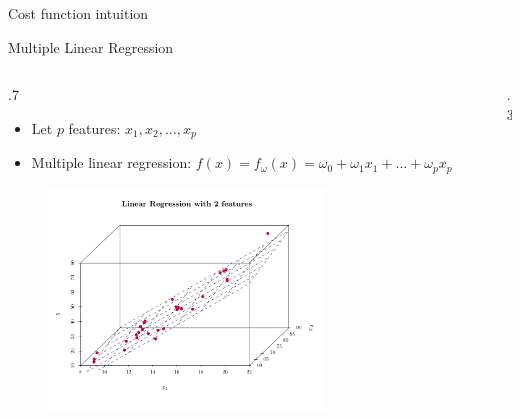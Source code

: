 \documentclass[
  9pt,
  ignorenonframetext,
  aspectratio=169,
  t, dvipsnames]{beamer}
\providecommand{\tightlist}{%
  \setlength{\itemsep}{0pt}\setlength{\parskip}{0pt}}\usepackage{longtable,booktabs,array}
\theoremstyle{definition}
\def\begincols{\begin{columns}}
\def\begincol{\begin{column}}
\def\endcol{\end{column}}
\def\endcols{\end{columns}}
\begin{document}
\begin{frame}{Cost function intuition}
\begin{figure}
\begin{minipage}[t]{0.33\linewidth}
{{}

}

\end{minipage}%
%
\begin{minipage}[t]{0.33\linewidth}

{\centering 


}

\end{minipage}%

\end{figure}
\end{frame}

\begin{frame}{Multiple Linear Regression}
\protect\hypertarget{multiple-linear-regression}{}
\begincols

\begincol{.7\textwidth}

\begin{itemize}
\tightlist
\item
  Let \(p\) features: \(x_1, x_2, \ldots, x_p\)
\item
  Multiple linear regression:
  \(f(x) = f_{\omega}(x) = \omega_0 + \omega_1 x_1 + \ldots + \omega_p x_p\)
\end{itemize}

\begin{figure}

{\centering \includegraphics[width=0.7\textwidth,height=\textheight]{CM1_Machine_Learning_files/figure-beamer/unnamed-chunk-12-1.pdf}

}

\end{figure}

\endcol
\begincol{.3\textwidth}
\endcol
\endcols
\end{frame}
\end{document}
